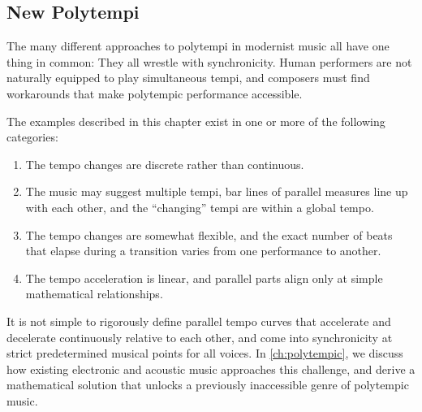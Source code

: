 
\subsection{New Polytempi}
\label{sec:new-polytempi}
The many different approaches to polytempi in modernist music all
have one thing in common: They all wrestle with synchronicity. Human
performers are not naturally equipped to play simultaneous tempi, and
composers must find workarounds that make polytempic performance
accessible.

The examples described in this chapter exist in one or more of the
following categories:
\begin{enumerate}
\item The tempo changes are discrete rather than continuous.
\item The music may suggest multiple tempi, bar lines of parallel 
  measures line up with each other, and the ``changing'' tempi are 
  within a global tempo. 
\item The tempo changes are somewhat flexible, and  the exact number of
  beats that elapse during a transition varies from one performance to
  another.
\item The tempo acceleration is linear, and parallel parts align only at simple
  mathematical relationships.
\end{enumerate}
It is not simple to rigorously define parallel tempo curves that
accelerate and decelerate continuously relative to each other, and
come into synchronicity at strict predetermined musical points for all
voices. In \autoref{ch:polytempic}, we discuss how existing electronic
and acoustic music approaches this challenge, and derive a
mathematical solution that unlocks a previously inaccessible genre of
polytempic music.

